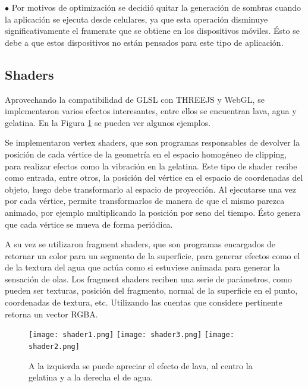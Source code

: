 \documentclass[12pt]{article}
\begin{document}
$\bullet$ Por motivos de optimización se decidió quitar la generación de sombras cuando la aplicación se ejecuta desde celulares, ya que esta operación disminuye significativamente el framerate que se obtiene en los dispositivos móviles. Ésto se debe a que estos dispositivos no están pensados para este tipo de aplicación.

\clearpage
\subsection{Shaders}
\noindent Aprovechando la compatibilidad de GLSL con THREEJS y WebGL, se implementaron varios efectos interesantes, entre ellos se encuentran lava, agua y gelatina. En la Figura \ref{shader} se pueden ver algunos ejemplos.

Se implementaron vertex shaders, que son programas responsables de devolver la posición de cada vértice de la geometría en el espacio homogéneo de clipping, para realizar efectos como la vibración en la gelatina. Este tipo de shader recibe como entrada, entre otros, la posición del vértice en el espacio de coordenadas del objeto, luego debe transformarlo al espacio de proyección. Al ejecutarse una vez por cada vértice, permite transformarlos de manera de que el mismo parezca animado, por ejemplo multiplicando la posición por seno del tiempo. Ésto genera que cada vértice se mueva de forma periódica.

A su vez se utilizaron fragment shaders, que son programas encargados de retornar un color para un segmento de la superficie, para generar efectos como el de la textura del agua que actúa como si estuviese animada para generar la sensación de olas. Los fragment shaders reciben una serie de parámetros, como pueden ser texturas, posición del fragmento, normal de la superficie en el punto, coordenadas de textura, etc. Utilizando las cuentas que considere pertinente retorna un vector RGBA.

\begin{figure}[h!]
\texttt{[image: shader1.png]}
\hfill
\texttt{[image: shader3.png]}
\hfill
\texttt{[image: shader2.png]}
\caption{ A la izquierda se puede apreciar el efecto de lava, al centro la gelatina y a la derecha el de agua.}
\label{shader}
\end{figure}
\end{document}

